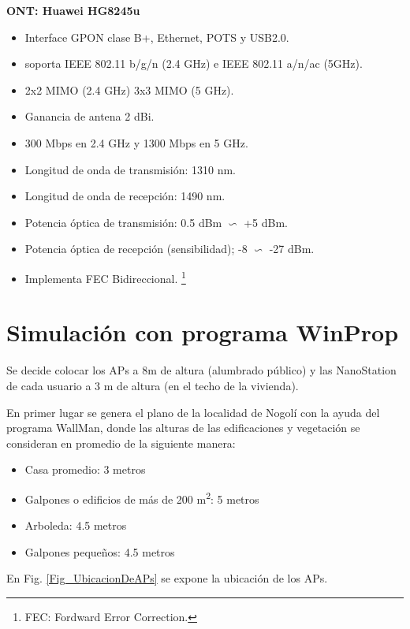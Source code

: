\documentclass[12pt,a4paper]{book}
\begin{document}
\textbf{ONT: Huawei HG8245u}\medskip
\begin{itemize}
\item Interface GPON clase B+, Ethernet, POTS y USB2.0.
\item soporta IEEE 802.11 b/g/n (2.4 GHz) e IEEE 802.11 a/n/ac (5GHz).
\item 2x2 MIMO (2.4 GHz) 3x3 MIMO (5 GHz).
\item Ganancia de antena 2 dBi.
\item 300 Mbps en 2.4 GHz y 1300 Mbps en 5 GHz.
\item Longitud de onda de transmisión: 1310 nm.
\item Longitud de onda de recepción: 1490 nm.
\item Potencia óptica de transmisión: 0.5 dBm $\backsim$ +5 dBm.
\item Potencia óptica de recepción (sensibilidad); -8 $\backsim$ -27 dBm.
\item Implementa FEC Bidireccional. \footnote{FEC: Fordward Error Correction.}
\end{itemize}\bigskip









\chapter{Simulación con programa WinProp} \label{ane_simulacion_Radio_red_acceso}

Se decide colocar los APs a 8m de altura (alumbrado público) y las
NanoStation de cada usuario a 3 m de altura (en el techo de la vivienda).

\medskip

En primer lugar se genera el plano de la localidad de Nogolí con la ayuda del programa WallMan, donde las alturas de las edificaciones y vegetación se consideran en promedio de la
siguiente manera:

\begin{itemize}
\item Casa promedio: 3 metros
\item Galpones o edificios de más de 200 m\textsuperscript 2: 5 metros
\item Arboleda: 4.5 metros
\item Galpones pequeños: 4.5 metros
\end{itemize}

En Fig. \ref{Fig_UbicacionDeAPs} se expone la ubicación de los APs.
\end{document}
